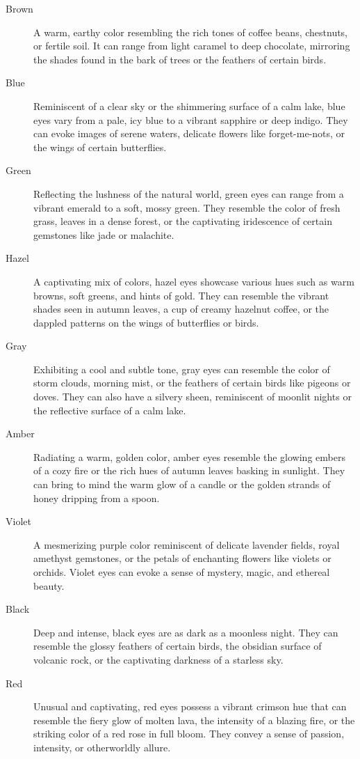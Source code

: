 \documentclass[12pt]{book}
\begin{document}
\begin{description}
    \item[Brown] A warm, earthy color resembling the rich tones of coffee beans, chestnuts, or fertile soil. It can range from light caramel to deep chocolate, mirroring the shades found in the bark of trees or the feathers of certain birds.
    \item[Blue] Reminiscent of a clear sky or the shimmering surface of a calm lake, blue eyes vary from a pale, icy blue to a vibrant sapphire or deep indigo. They can evoke images of serene waters, delicate flowers like forget-me-nots, or the wings of certain butterflies.
    \item[Green] Reflecting the lushness of the natural world, green eyes can range from a vibrant emerald to a soft, mossy green. They resemble the color of fresh grass, leaves in a dense forest, or the captivating iridescence of certain gemstones like jade or malachite.
    \item[Hazel] A captivating mix of colors, hazel eyes showcase various hues such as warm browns, soft greens, and hints of gold. They can resemble the vibrant shades seen in autumn leaves, a cup of creamy hazelnut coffee, or the dappled patterns on the wings of butterflies or birds.
    \item[Gray] Exhibiting a cool and subtle tone, gray eyes can resemble the color of storm clouds, morning mist, or the feathers of certain birds like pigeons or doves. They can also have a silvery sheen, reminiscent of moonlit nights or the reflective surface of a calm lake.
    \item[Amber] Radiating a warm, golden color, amber eyes resemble the glowing embers of a cozy fire or the rich hues of autumn leaves basking in sunlight. They can bring to mind the warm glow of a candle or the golden strands of honey dripping from a spoon.
    \item[Violet] A mesmerizing purple color reminiscent of delicate lavender fields, royal amethyst gemstones, or the petals of enchanting flowers like violets or orchids. Violet eyes can evoke a sense of mystery, magic, and ethereal beauty.
    \item[Black] Deep and intense, black eyes are as dark as a moonless night. They can resemble the glossy feathers of certain birds, the obsidian surface of volcanic rock, or the captivating darkness of a starless sky.
    \item[Red] Unusual and captivating, red eyes possess a vibrant crimson hue that can resemble the fiery glow of molten lava, the intensity of a blazing fire, or the striking color of a red rose in full bloom. They convey a sense of passion, intensity, or otherworldly allure.

\end{description}
\end{document}
